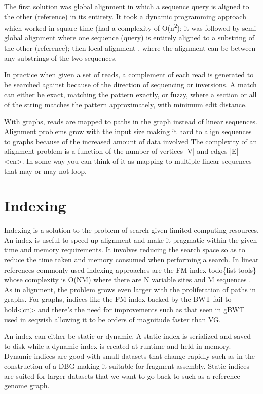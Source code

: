 \documentclass[11pt]{article}
\begin{document}
The first solution was global alignment
\cite{needlemanGeneralMethodApplicable1970} in which a sequence query is aligned
to the other (reference) in its entirety. It took a dynamic programming approach
which worked in square time (had a complexity of O(n\textsuperscript{2}); it was followed by 
semi-global alignment \cite{sellersTheoryComputationEvolutionary1980}
where one sequence (query) is entirely
aligned to a substring of the other (reference); then local alignment
\cite{smithIdentificationCommonMolecular1981}, where the alignment can be between 
any substrings of the two sequences.

In practice when given a set of reads, a complement of each read is generated to 
be searched against because of the direction of sequencing or inversions.
A match can either be exact, matching the pattern exactly, or fuzzy, where a 
section or all of the string matches the pattern approximately, with minimum 
edit distance.

With graphs, reads are mapped to paths in the graph instead of linear sequences.
Alignment problems grow with the input size
\cite{durbinEfficientHaplotypeMatching2014} making it hard to align sequences to
graphs  because of the increased amount of data involved
The complexity of an alignment problem is a function of the
number of  vertices |V| and edges |E| <cn>.  In some way you can think of it 
as mapping to multiple linear sequences that may or may not loop.

\section{Indexing}
\label{sec:orgce10310}
Indexing is a solution to the problem of search given limited computing
resources. An index is useful to speed up alignment and make it pragmatic within
the given time and memory requirements. 
It involves reducing the search space so as to reduce the time taken and memory
consumed when performing a search.
In linear references commonly used indexing approaches are the FM index 
todo\{list tools\} whose complexity is O(NM) where there are N variable sites and 
M sequences \cite{durbinEfficientHaplotypeMatching2014}.
As in alignment, the problem grows even larger with the proliferation of paths 
in graphs. For graphs, indices like the FM-index backed by the BWT fail to hold<cn> 
and there’s the need for improvements such as that seen in gBWT used in seqwish 
allowing it to be orders of magnitude faster than VG.

An index can either be static or dynamic. A static index is serialized and saved
to disk while a dynamic index is created at runtime and held in memory. Dynamic
indices are good with small datasets that change rapidly such as in the
construction of a DBG making it suitable for fragment assembly. Static indices 
are suited for larger datasets that we want to go back to such as a reference
genome graph.
\end{document}
